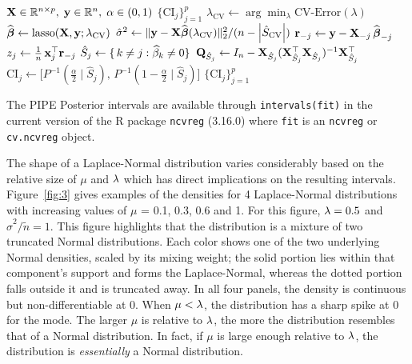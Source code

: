 \begin{algorithm}[!ht]
  \caption{PIPE-P Intervals at a single CV-chosen \(\lambda\)}
  \label{alg:singlelambda-ci}
  \begin{algorithmic}[1]
    \Require \(\mathbf{X}\in\mathbb{R}^{n\times p},\;\mathbf{y}\in\mathbb{R}^n,\;\alpha\in(0,1)\)
    \Ensure \(\{\mathrm{CI}_j\}_{j=1}^p\)
    \State \(\lambda_{\mathrm{CV}}\gets\arg\min_{\lambda}\mathrm{CV\mbox{-}Error}(\lambda)\)
    \State \(\widehat{\boldsymbol{\beta}}\gets\mathrm{lasso}(\mathbf{X},\mathbf{y};\lambda_{\mathrm{CV}})\)
    \State $\hat{\sigma}^2 \gets \lVert\mathbf{y} - \mathbf{X}\widehat{\boldsymbol{\beta}}({\lambda_{\textrm{CV}}})\rVert_2^2 / (n - \left\lvert\hat{S}_{\textrm{CV}}\right\rvert)$
    \State \(\mathbf{r}_{-j}\gets \mathbf{y} - \mathbf{X}_{-j}\,\widehat{\boldsymbol{\beta}}_{-j}\)
    \State \(z_j\gets \tfrac{1}{n}\,\mathbf{x}_j^\top \mathbf{r}_{-j}\)
    \State \(\hat S_j\gets\{\,k\neq j : \widehat{\beta}_k\neq0\}\)
    \State \(\mathbf{Q}_{\hat S_j}\gets I_n - \mathbf{X}_{\hat S_j}(\mathbf{X}_{\hat S_j}^\top \mathbf{X}_{\hat S_j})^{-1}\mathbf{X}_{\hat S_j}^\top\)
    \State \(\mathrm{CI}_j\gets \bigl[P^{-1}(\tfrac{\alpha}{2}\mid\hat S_j),\,P^{-1}(1-\tfrac{\alpha}{2}\mid\hat S_j)\bigr]\)
    \EndFor
    \State \Return \(\{\mathrm{CI}_j\}_{j=1}^p\)
  \end{algorithmic}
\end{algorithm}

The PIPE Posterior intervals are available through \verb|intervals(fit)| in the current version of the R package \texttt{ncvreg} (3.16.0) where \texttt{fit} is an \texttt{ncvreg} or \texttt{cv.ncvreg} object.

The shape of a Laplace-Normal distribution varies considerably based on the relative size of $\mu$ and $\lambda$ which has direct implications on the resulting intervals. Figure~\ref{fig:3} gives examples of the densities for 4 Laplace-Normal distributions with increasing values of $\mu$ = 0.1, 0.3, 0.6 and 1. For this figure, $\lambda = 0.5$ and $\hat{\sigma}^2 / \tilde{n} = 1$. This figure highlights that the distribution is a mixture of two truncated Normal distributions. Each color shows one of the two underlying Normal densities, scaled by its mixing weight; the solid portion lies within that component's support and forms the Laplace-Normal, whereas the dotted portion falls outside it and is truncated away. In all four panels, the density is continuous but non-differentiable at 0. When $\mu < \lambda$, the distribution has a sharp spike at 0 for the mode. The larger $\mu$ is relative to $\lambda$, the more the distribution resembles that of a Normal distribution. In fact, if $\mu$ is large enough relative to $\lambda$, the distribution is \emph{essentially} a Normal distribution.

